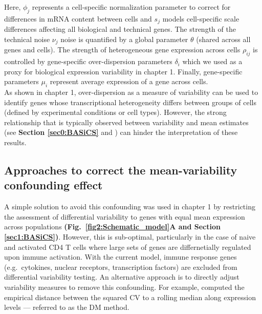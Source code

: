 Here, $\phi_j$ represents a cell-specific normalization parameter to correct for differences in mRNA content between cells and $s_j$ models cell-specific scale differences affecting all biological and technical genes. The strength of the technical noise $\nu_j$ noise is quantified by a global parameter $\theta$ (shared across all genes and cells). The strength of heterogeneous gene expression across cells $\rho_{ij}$ is controlled by gene-specific over-dispersion parameters $\delta_i$ which we used as a proxy for biological expression variability in chapter 1.  Finally, gene-specific parameters $\mu_i$ represent average expression of a gene across cells. \\

As shown in chapter 1, over-dispersion as a measure of variability can be used to identify genes whose transcriptional heterogeneity differs between groups of cells (defined by experimental conditions or cell types). However, the strong relationship that is typically observed between variability and mean estimates (see \textbf{Section \ref{sec0:BASiCS}} and \citep{Brennecke2013}) can hinder the interpretation of these results. 

\newpage

\subsection{Approaches to correct the mean-variability confounding effect}

A simple solution to avoid this confounding was used in chapter 1 by restricting the assessment of differential variability to genes with equal mean expression across populations \textbf{(Fig.~\ref{fig2:Schematic_model}A and Section \ref{sec1:BASiCS})}. However, this is sub-optimal, particularly in the case of naive and activated CD4\plus{} T cells where large sets of genes are differnetially regulated upon immune activation. With the current model, immune response genes (e.g.~cytokines, nuclear receptors, transcription factors) are excluded from differential variability testing. An alternative approach is to directly adjust variability measures to remove this confounding. For example, \cite{Kolodziejczyk2015cell} computed the empirical distance between the squared CV to a rolling median along expression levels --- referred to as the DM method.  \\

